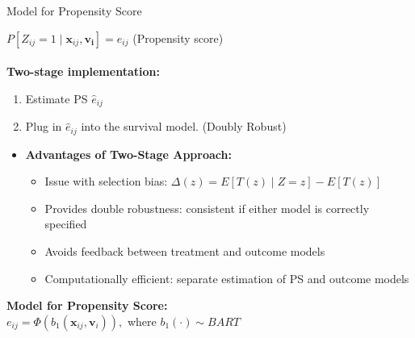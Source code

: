 \documentclass{beamer}
\begin{document}
\begin{frame}{Model for Propensity Score}
   
  $P[Z_{ij}=1\mid \mathbf{x}_{ij},\mathbf{v_i}]=e_{ij}$ (Propensity score) \\
  
  \\
  \textbf{Two-stage implementation:} \\
  \begin{enumerate}
    \vfill \item Estimate PS $\hat{e}_{ij}$
    \vfill \item Plug in $\hat{e}_{ij}$ into the survival model. (Doubly Robust)
  \end{enumerate}
  \vspace{6pt}

  \begin{itemize}
    \vfill \item \textbf{Advantages of Two-Stage Approach:}
    \begin{itemize}
        \vfill \item Issue with selection bias: $\Delta(z)=E[T(z)\mid Z=z]-E[T(z)]$
       \vfill \item Provides double robustness: consistent if either model is correctly specified
        \vfill \item Avoids feedback between treatment and outcome models
        \vfill \item Computationally efficient: separate estimation of PS and outcome models
    \end{itemize}
  \end{itemize}
  \vspace{6pt}
  \textbf{Model for Propensity Score:}\\
  $e_{ij}=\Phi(b_1(\mathbf{x}_{ij},\mathbf{v}_i)),$ where $b_1(\cdot)\sim BART$
  
\end{frame}
\end{document}
